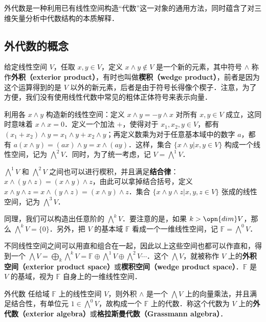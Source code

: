 外代数是一种利用已有线性空间构造“代数”这一对象的通用方法，同时蕴含了对三维矢量分析中代数结构的本质解释．

\subsection{外代数的概念}

给定线性空间 $V$，任取 $x, y\in V$，定义 $x\wedge y\not\in V$ 是一个新的元素，其中符号 $\wedge$ 称作\textbf{外积（exterior product）}，有时也叫做\textbf{楔积（wedge product）}，前者是因为这个运算得到的是 $V$ 以外的新元素，后者是由于符号长得像个楔子．注意，为了方便，我们没有使用线性代数中常见的粗体正体符号来表示向量．

利用各 $x\wedge y$ 构造新的线性空间：定义 $x\wedge y=-y\wedge x$ 对所有 $x, y\in V$ 成立，这同时意味着 $x\wedge x=0$．定义一个加法 $+$，使得对于 $x_1, x_2, y\in V$，都有 $(x_1+x_2)\wedge y=x_1\wedge y+x_2\wedge y$；再定义数乘为对于任意基本域中的数字 $a$，都有 $a(x\wedge y)=(ax)\wedge y=x\wedge(ay)$．这样，集合 $\{x\wedge y|x, y\in V\}$ 构成一个线性空间，记为 $\bigwedge^2 V$．同时，为了统一考虑，记 $V=\bigwedge^1 V$．

$\bigwedge^1 V$ 和 $\bigwedge^2 V$ 之间也可以进行楔积，并且满足\textbf{结合律}：$x\wedge(y\wedge z)=(x\wedge y)\wedge z$，由此可以拿掉结合括号，定义 $x\wedge y\wedge z=x\wedge(y\wedge z)=(x\wedge y)\wedge z$．集合 $\{x\wedge y\wedge z|x, y, z\in V\}$ 张成的线性空间，记为 $\bigwedge^3 V$．

同理，我们可以构造出任意阶的 $\bigwedge^k V$．要注意的是，如果 $k>\opn{dim} V$，那么 $\bigwedge^k V=\{0\}$．另外，把 $V$ 的基本域 $\mathbb{F}$ 看成一个一维线性空间，记 $\mathbb{F}=\bigwedge^0 V$．

不同线性空间之间可以用直和组合在一起，因此以上这些空间也都可以作直和，得到一个 $\bigwedge V=\bigoplus_k\bigwedge^k V=\mathbb{F}\oplus\bigwedge^1V\oplus\bigwedge^2V\cdots$．这个 $\bigwedge V$，就被称作 $V$ 上的\textbf{外积空间（exterior product space）}或\textbf{楔积空间（wedge product space）}．$\mathbb{F}$ 是 $V$ 的基域，视为 $\mathbb{F}$ 自身上的一维线性空间．

\begin{theorem}{外代数}
任给域 $\mathbb{F}$ 上的线性空间 $V$，则外积 $\wedge$ 是一个 $\bigwedge V$ 上的向量乘法，并且满足结合性，有单位元 $1\in \bigwedge^0 V$，故构成一个 $\mathbb{F}$ 上的代数．称这个代数为 $V$ 上的\textbf{外代数（exterior algebra）}或\textbf{格拉斯曼代数（Grassmann algebra）}．
\end{theorem}

